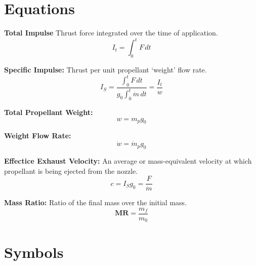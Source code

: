 \documentclass[12pt]{article}
\begin{document}
\section*{Equations}

\textbf{Total Impulse}
Thrust force integrated over the time of application.
\begin{equation}
    I_t = \int_{0}^{t}F\,dt 
\end{equation}

\bigskip
\noindent
\textbf{Specific Impulse:}
Thrust per unit propellant `weight' flow rate. 
\begin{equation}
    I_S = \frac{\int_{0}^{t}F\,dt }{g_0\int_{0}^{t}\dot{m}\,dt} = \frac{I_t}{w} 
\end{equation}

\bigskip
\noindent
\textbf{Total Propellant Weight:}
\begin{equation}
    w = m_p g_0
\end{equation}

\bigskip
\noindent
\textbf{Weight Flow Rate:}
\begin{equation}
    \dot{w} = \dot{m}_p g_0
\end{equation}

\bigskip
\noindent
\textbf{Effectice Exhaust Velocity: }
An average or mass-equivalent velocity at which propellant is being ejected from the nozzle.
\begin{equation}
    c = I_S g_0 = \frac{F}{\dot{m}}
\end{equation}

\bigskip
\noindent
\textbf{Mass Ratio:}
Ratio of the final mass over the initial mass. 
\begin{equation}
    \mathbf{M}\mathbf{R} = \frac{m_f}{m_0}
\end{equation}



\section*{Symbols}
\end{document}

